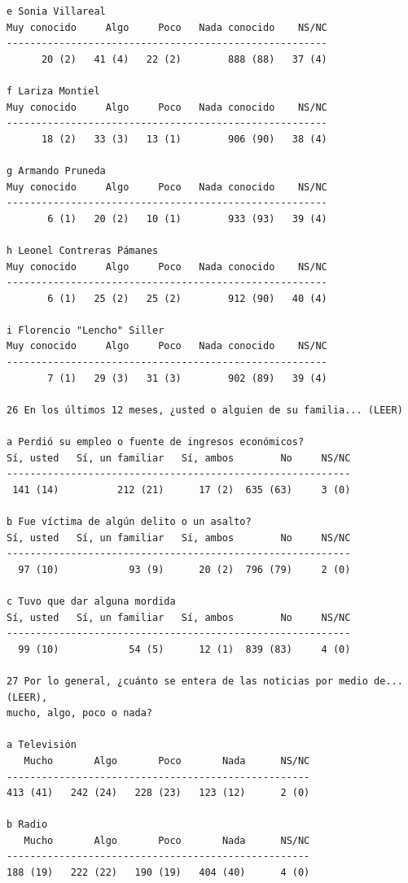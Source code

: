 \documentclass[letter,12pt]{article}
\begin{document}
\begin{scriptsize}
\begin{verbatim}
e Sonia Villareal          
Muy conocido     Algo     Poco   Nada conocido    NS/NC 
-------------------------------------------------------
      20 (2)   41 (4)   22 (2)        888 (88)   37 (4) 

f Lariza Montiel           
Muy conocido     Algo     Poco   Nada conocido    NS/NC 
-------------------------------------------------------
      18 (2)   33 (3)   13 (1)        906 (90)   38 (4) 

g Armando Pruneda          
Muy conocido     Algo     Poco   Nada conocido    NS/NC 
-------------------------------------------------------
       6 (1)   20 (2)   10 (1)        933 (93)   39 (4) 

h Leonel Contreras Pámanes 
Muy conocido     Algo     Poco   Nada conocido    NS/NC 
-------------------------------------------------------
       6 (1)   25 (2)   25 (2)        912 (90)   40 (4) 

i Florencio "Lencho" Siller
Muy conocido     Algo     Poco   Nada conocido    NS/NC 
-------------------------------------------------------
       7 (1)   29 (3)   31 (3)        902 (89)   39 (4) 

26 En los últimos 12 meses, ¿usted o alguien de su familia... (LEER)

a Perdió su empleo o fuente de ingresos económicos?
Sí, usted   Sí, un familiar   Sí, ambos        No     NS/NC 
-----------------------------------------------------------
 141 (14)          212 (21)      17 (2)  635 (63)     3 (0) 

b Fue víctima de algún delito o un asalto?
Sí, usted   Sí, un familiar   Sí, ambos        No     NS/NC 
-----------------------------------------------------------
  97 (10)            93 (9)      20 (2)  796 (79)     2 (0) 

c Tuvo que dar alguna mordida
Sí, usted   Sí, un familiar   Sí, ambos        No     NS/NC 
-----------------------------------------------------------
  99 (10)            54 (5)      12 (1)  839 (83)     4 (0) 

27 Por lo general, ¿cuánto se entera de las noticias por medio de... (LEER), 
mucho, algo, poco o nada?

a Televisión
   Mucho       Algo       Poco       Nada      NS/NC 
----------------------------------------------------
413 (41)   242 (24)   228 (23)   123 (12)      2 (0) 

b Radio
   Mucho       Algo       Poco       Nada      NS/NC 
----------------------------------------------------
188 (19)   222 (22)   190 (19)   404 (40)      4 (0) 


\end{verbatim}
\end{scriptsize}
\end{document}
